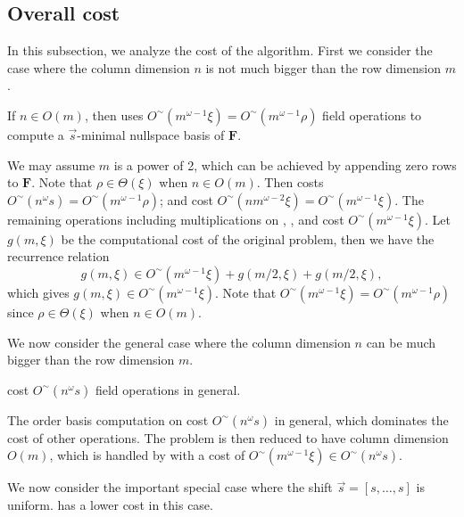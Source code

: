 


\subsection{Overall cost}

In this subsection, we analyze the cost of the algorithm. First we
consider the case where the column dimension $n$ is not much bigger
than the row dimension $m$. 
\begin{lem}
\label{lem:costLowColDimension}If $n\in O\left(m\right)$, then 
uses $O^{\sim}\left(m^{\omega-1}\xi\right)=O^{\sim}\left(m^{\omega-1}\rho\right)$
field operations to compute a $\vec{s}$-minimal nullspace basis of
$\mathbf{F}$.\end{lem}
\begin{pf}
We may assume $m$ is a power of 2, which can be achieved by appending
zero rows to $\mathbf{F}$. Note that $\rho\in\Theta\left(\xi\right)$
when $n\in O\left(m\right)$. Then  costs
$O^{\sim}\left(n^{\omega}s\right)=O^{\sim}\left(m^{\omega-1}\rho\right)$;
 and cost
$O^{\sim}\left(nm^{\omega-2}\xi\right)=O^{\sim}\left(m^{\omega-1}\xi\right)$.
The remaining operations including multiplications on ,
, and 
cost $O^{\sim}\left(m^{\omega-1}\xi\right)$. Let $g(m,\xi)$ be the
computational cost of the original problem, then we have the recurrence
relation 
\[
g(m,\xi)\in O^{\sim}(m^{\omega-1}\xi)+g(m/2,\xi)+g(m/2,\xi),
\]
 which gives $g(m,\xi)\in O^{\sim}(m^{\omega-1}\xi)$. Note that $O^{\sim}\left(m^{\omega-1}\xi\right)=O^{\sim}\left(m^{\omega-1}\rho\right)$
since $\rho\in\Theta\left(\xi\right)$ when $n\in O\left(m\right)$.
\end{pf}
We now consider the general case where the column dimension $n$ can
be much bigger than the row dimension $m$.
\begin{lem}
\label{lem:costGeneral} cost
$O^{\sim}\left(n^{\omega}s\right)$ field operations in general.\end{lem}
\begin{pf}
The order basis computation on  cost $O^{\sim}\left(n^{\omega}s\right)$
in general, which dominates the cost of other operations. The problem
is then reduced to have column dimension $O\left(m\right)$, which
is handled by  with a cost of
$O^{\sim}\left(m^{\omega-1}\xi\right)\in O^{\sim}\left(n^{\omega}s\right)$.
\end{pf}
We now consider the important special case where the shift $\vec{s}=\left[s,\dots,s\right]$
is uniform.  has a lower cost
in this case.

